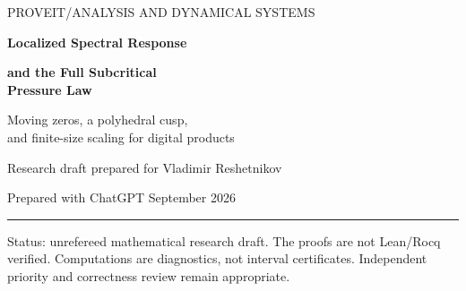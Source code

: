 \documentclass[11pt,a4paper]{article}
\numberwithin{equation}{section}
\theoremstyle{definition}
\theoremstyle{remark}
\newcommand{\norm}[1]{\left\lVert#1\right\rVert}
\newcommand{\eps}{\boldsymbol\varepsilon}
\begin{document}
\hypersetup{pageanchor=false}
\begin{titlepage}
\thispagestyle{empty}
\setlength{\parindent}{0pt}
{\small\sffamily\color{ink} PROVEIT\quad /\quad ANALYSIS AND DYNAMICAL SYSTEMS}\par
\vspace{17mm}
{\Huge\bfseries\color{ink} Localized Spectral Response\par}
\vspace{5mm}
{\LARGE\bfseries and the Full Subcritical\\[2mm] Pressure Law\par}
\vspace{10mm}
{\Large Moving zeros, a polyhedral cusp,\\[1mm] and finite-size scaling for digital products\par}
\vspace{12mm}
{\large Research draft prepared for Vladimir Reshetnikov\par}
{Prepared with ChatGPT\quad\textbullet{} September 2026\par}
\vspace{8mm}\hrule\vspace{4mm}
\begin{abstract}
The latest critical-pressure report in the ProveIt repository leaves the
atomic-phase asymptotic unresolved for absolute-moment exponents
$0<s\leq 1/2$. We close that local gap and obtain a quantitative result
throughout $0<s<1$. For the normalized digital mask in every integer
base $b\geq2$,
\[
 P_{b,s}(c)=(1-s)\log b
 +(b-1)\pi s\tan(\pi s/2)|c|
 +O_{b,s,\alpha}(|c|^{1+s-\alpha}),\qquad 0<\alpha<s.
\]
The missing ingredient is a cancellation estimate for the perturbation
paired with the atomic left eigenfunctional. This pairing is $O(|c|)$
on $C^\alpha$, although its total-variation norm is of order
$|c|\log(1/|c|)$ and the full operator changes only by
$O(|c|^{s-\alpha})$.

A stronger multivariate theorem moves the $b-1$ mask zeros independently.
With their displacements denoted by $\eps$, the leading pressure response
is exactly $\pi s\tan(\pi s/2)\norm\eps_1$: the tangent cusp is
polyhedral, not quadratic, and opposite zero motions do not cancel.
We prove a weak distributional expansion, an explicit atomic spectral
gap, the pressure--moment identification, a compact-parameter uniform
version, and an operator finite-size law with an elementary amplitude.
Every repository-specific ingredient is rederived. Reproducible numerical
diagnostics and ten further research questions accompany the proofs.
\end{abstract}
\vfill
{\small\color{muted} Status: unrefereed mathematical research draft. The proofs are not
Lean/Rocq verified. Computations are diagnostics, not interval certificates.
Independent priority and correctness review remain appropriate.}
\end{titlepage}
\hypersetup{pageanchor=true}
\end{document}
